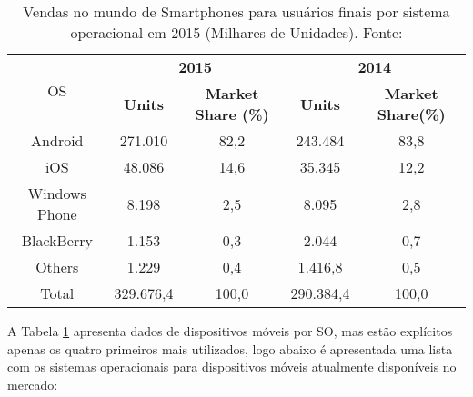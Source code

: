 \begin{table}[ph]
	\footnotesize
	\centering
	\caption[Sistemas operacionais mais utilizados]{Vendas no mundo de Smartphones para usuários finais por sistema operacional em 2015 (Milhares de Unidades). Fonte: \cite{gartner}}
	\begin{tabular}{|*5{c|}}
		\hline
		\multirow{2}{*}{OS} & \multicolumn{2}{|c|}{\textbf{2015}} & \multicolumn{2}{|c|}{\textbf{2014}}\\ \hhline{~----}
		 & \textbf{Units}  & \textbf{Market Share (\%)} & \textbf{Units}  & \textbf{Market Share(\%)}\\ \hline \SPACE
		Android & 271.010 & 82,2 & 243.484 & 83,8\\ \hline \SPACE
		iOS & 48.086 & 14,6 & 35.345 & 12,2\\ \hline \SPACE
		Windows Phone & 8.198 & 2,5 & 8.095 & 2,8\\ \hline \SPACE
		BlackBerry & 1.153 & 0,3 & 2.044 & 0,7\\ \hline \SPACE
		Others & 1.229 & 0,4 & 1.416,8 & 0,5\\ \hline \SPACE
		Total & 329.676,4 & 100,0 & 290.384,4 & 100,0\\
		\hline
	\end{tabular}
	\label{tab:OS}
\end{table}

A Tabela \ref{tab:OS} apresenta dados de dispositivos móveis por SO, mas estão explícitos apenas os quatro primeiros mais utilizados, logo abaixo é apresentada uma lista com os sistemas operacionais para dispositivos móveis atualmente disponíveis no mercado:

